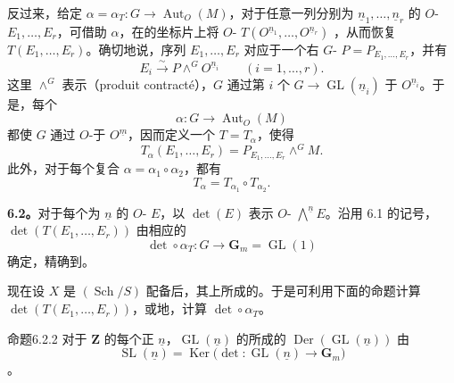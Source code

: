 反过来，给定 $\alpha=\alpha_T:G\to\operatorname{Aut}_O(M)$，对于任意一列分别为 $\underline n_1,\ldots,\underline n_r$ 的 $O$-
$E_1,\ldots,E_r$，可借助 $\alpha$，在的坐标片上将 $O$- $T(O^{\underline n_1},\ldots,O^{\underline n_r})$ ，从而恢复 $T(E_1,\ldots,E_r)$。确切地说，序列 $E_1,\ldots,E_r$ 对应于一个右 $G$- $P=P_{E_1,\ldots,E_r}$，并有
\[
 E_i\xrightarrow{\sim}P\mathbin{\wedge^G}O^{\underline n_i}
 \qquad(i=1,\ldots,r).\tag{6.1.3}
\]
这里 $\mathbin{\wedge^G}$ 表示（produit contracté），$G$ 通过第 $i$ 个 $G\to\operatorname{GL}(\underline n_i)$ 于 $O^{\underline n_i}$。于是，每个
\[
 \alpha:G\longrightarrow\operatorname{Aut}_O(M)
\]
都使 $G$ 通过 $O$-于 $O^{\underline m}$，因而定义一个 $T=T_\alpha$，使得
\[
 T_\alpha(E_1,\ldots,E_r)=P_{E_1,\ldots,E_r}\mathbin{\wedge^G}M.
 \tag{6.1.4}
\]
此外，对于每个复合 $\alpha=\alpha_1\circ\alpha_2$，都有
\[
 T_\alpha=T_{\alpha_1}\circ T_{\alpha_2}.\tag{6.1.5}
\]

\textbf{6.2。}对于每个为 $\underline n$ 的 $O$- $E$，以 $\det(E)$ 表示 $O$- $\bigwedge^{\underline n}E$。沿用 6.1 的记号， $\det(T(E_1,\ldots,E_r))$ 由相应的
\[
 \det\circ\alpha_T:G\longrightarrow\mathbf G_m=\operatorname{GL}(1)
 \tag{6.2.1}
\]
确定，精确到。

现在设 $X$ 是 $(\operatorname{Sch}/S)$ 配备后，其上所成的。于是可利用下面的命题计算 $\det(T(E_1,\ldots,E_r))$，或地，计算 $\det\circ\alpha_T$。

\begin{SGAresult}{命题}{6.2.2}
对于 $\mathbf Z$ 的每个正 $\underline n$，$\operatorname{GL}(\underline n)$ 的所成的 $\operatorname{Der}(\operatorname{GL}(\underline n))$ 由
\[
 \operatorname{SL}(\underline n)=
 \operatorname{Ker}\bigl(\det:\operatorname{GL}(\underline n)\longrightarrow\mathbf G_m\bigr)
\]
。
\end{SGAresult}

